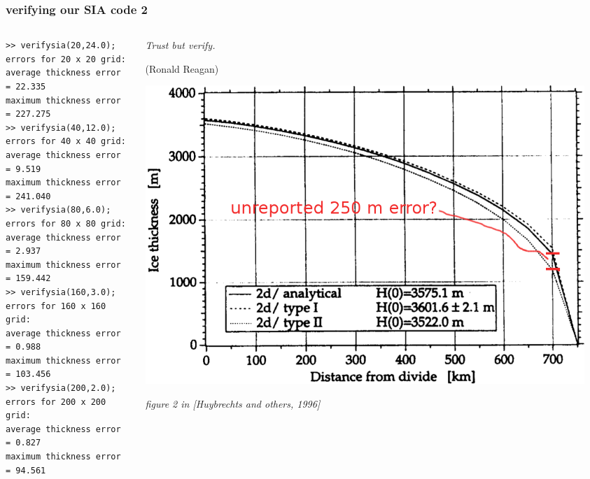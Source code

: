 \begin{frame}[fragile]
\frametitle{verifying our SIA code 2}

\begin{columns}
\begin{column}{0.65\textwidth}
\small
\begin{verbatim}
>> verifysia(20,24.0);
errors for 20 x 20 grid:
average thickness error  = 22.335
maximum thickness error  = 227.275
>> verifysia(40,12.0);
errors for 40 x 40 grid:
average thickness error  = 9.519
maximum thickness error  = 241.040
>> verifysia(80,6.0);
errors for 80 x 80 grid:
average thickness error  = 2.937
maximum thickness error  = 159.442
>> verifysia(160,3.0);
errors for 160 x 160 grid:
average thickness error  = 0.988
maximum thickness error  = 103.456
>> verifysia(200,2.0);
errors for 200 x 200 grid:
average thickness error  = 0.827
maximum thickness error  = 94.561
\end{verbatim}
\normalsize
\end{column}

\begin{column}{0.35\textwidth}
\small
\emph{Trust but verify.}
\medskip

\tiny (Ronald Reagan)

\bigskip\bigskip\bigskip

\includegraphics[width=0.95\textwidth]{photos/eismintone}

\scriptsize \emph{figure 2 in [Huybrechts and others, 1996]}
\end{column}
\end{columns}
\end{frame}


